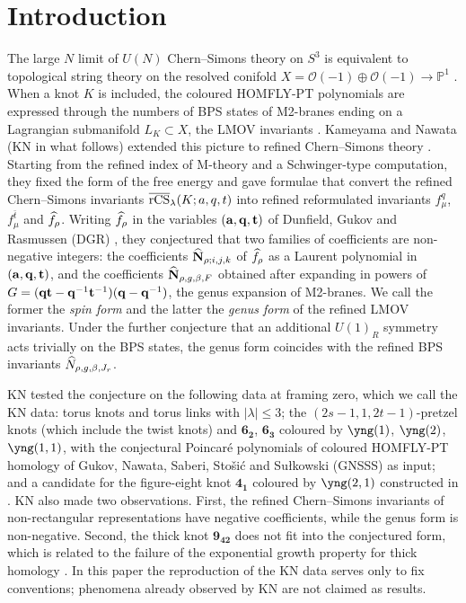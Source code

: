 \section{Introduction}\label{sec:intro}

The large $N$ limit of $U(N)$ Chern--Simons theory \cite{Witten89} on $S^3$ is equivalent to topological string theory on the resolved conifold
$X=\mathcal{O}(-1)\oplus\mathcal{O}(-1)\to\mathbb{P}^1$ \cite{Gopakumar98}.
When a knot $K$ is included, the coloured HOMFLY-PT polynomials are expressed through the numbers of BPS states of M2-branes ending on a Lagrangian
submanifold $L_K\subset X$, the LMOV invariants \cite{Ooguri99,Labastida01}.
Kameyama and Nawata \cite{Kameyama17} (KN in what follows) extended this picture to refined Chern--Simons theory \cite{Aganagic11}.
Starting from the refined index of M-theory and a Schwinger-type computation, they fixed the form of the free energy and gave formulae that convert
the refined Chern--Simons invariants $\overline{\mathrm{rCS}}_\lambda(K;a,q,t)$ into refined reformulated invariants $f^q_\mu$, $f^{\bar t}_\mu$ and $\widehat{f}_\rho$.
Writing $\widehat{f}_\rho$ in the variables $(\mathbf{a},\mathbf{q},\mathbf{t})$ of Dunfield, Gukov and Rasmussen (DGR) \cite{Dunfield05}, they conjectured that two families of coefficients are non-negative integers:
the coefficients $\widehat{\mathbf{N}}_{\rho;i,j,k}$ of $\widehat{f}_\rho$ as a Laurent polynomial in $(\mathbf{a},\mathbf{q},\mathbf{t})$,
and the coefficients $\widehat{\mathbf{N}}_{\rho,g,\beta,F}$ obtained after expanding in powers of $G=(\mathbf{q}\mathbf{t}-\mathbf{q}^{-1}\mathbf{t}^{-1})(\mathbf{q}-\mathbf{q}^{-1})$, the genus expansion of M2-branes.
We call the former the \emph{spin form} and the latter the \emph{genus form} of the refined LMOV invariants.
Under the further conjecture that an additional $U(1)_R$ symmetry acts trivially on the BPS states, the genus form coincides with the refined BPS invariants $\widehat{N}_{\rho,g,\beta,J_r}$.

KN tested the conjecture on the following data at framing zero, which we call the KN data:
torus knots and torus links with $|\lambda|\le3$;
the $(2s-1,1,2t-1)$-pretzel knots (which include the twist knots) and $\mathbf{6_2}$, $\mathbf{6_3}$ coloured by $\yng(1)$, $\yng(2)$, $\yng(1,1)$, with the conjectural Poincar\'e polynomials of
coloured HOMFLY-PT homology of Gukov, Nawata, Saberi, Sto\v{s}i\'c and Su\l{}kowski (GNSSS) \cite{Gukov15} as input;
and a candidate for the figure-eight knot $\mathbf{4_1}$ coloured by $\yng(2,1)$ constructed in \cite{Kameyama17}.
KN also made two observations. First, the refined Chern--Simons invariants of non-rectangular representations have negative coefficients, while the genus form is non-negative.
Second, the thick knot $\mathbf{9_{42}}$ does not fit into the conjectured form, which is related to the failure of the exponential growth property for thick homology \cite{Gukov11}.
In this paper the reproduction of the KN data serves only to fix conventions; phenomena already observed by KN are not claimed as results.

